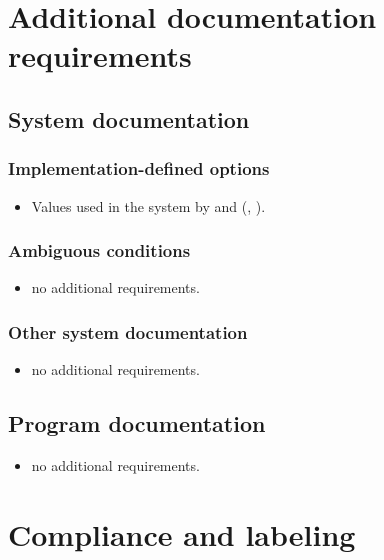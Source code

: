 \section{Additional documentation requirements} %

\subsection{System documentation} %

\subsubsection{Implementation-defined options} %
\begin{itemize}
\item Values used in the system by  and
	(,
	 ).
\end{itemize}

\subsubsection{Ambiguous conditions} %
\begin{itemize}
\item no additional requirements.
\end{itemize}

\subsubsection{Other system documentation} %
\begin{itemize}
\item no additional requirements.
\end{itemize}

\subsection{Program documentation} %
\begin{itemize}
\item no additional requirements.
\end{itemize}

\section{Compliance and labeling} %

